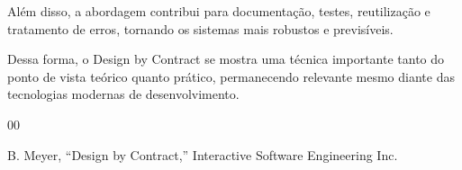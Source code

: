 \documentclass[conference]{IEEEtran}
\begin{document}
Além disso, a abordagem contribui para documentação, testes, reutilização e tratamento de erros, tornando os sistemas mais robustos e previsíveis.

Dessa forma, o Design by Contract se mostra uma técnica importante tanto do ponto de vista teórico quanto prático, permanecendo relevante mesmo diante das tecnologias modernas de desenvolvimento.

\begin{thebibliography}{00}

B. Meyer,
``Design by Contract,'' 
Interactive Software Engineering Inc.

\end{thebibliography}
\end{document}
